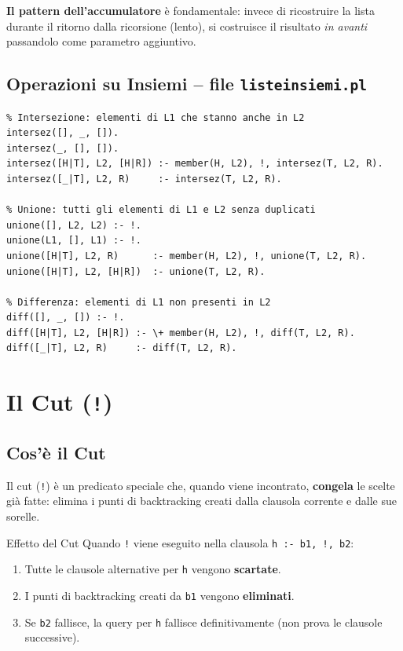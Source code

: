 \documentclass[12pt,a4paper]{article}
\begin{document}
\textbf{Il pattern dell'accumulatore} è fondamentale: invece di ricostruire la
lista durante il ritorno dalla ricorsione (lento), si costruisce il risultato
\emph{in avanti} passandolo come parametro aggiuntivo.

\subsection{Operazioni su Insiemi -- file \texttt{listeinsiemi.pl}}

\begin{lstlisting}
% Intersezione: elementi di L1 che stanno anche in L2
intersez([], _, []).
intersez(_, [], []).
intersez([H|T], L2, [H|R]) :- member(H, L2), !, intersez(T, L2, R).
intersez([_|T], L2, R)     :- intersez(T, L2, R).

% Unione: tutti gli elementi di L1 e L2 senza duplicati
unione([], L2, L2) :- !.
unione(L1, [], L1) :- !.
unione([H|T], L2, R)      :- member(H, L2), !, unione(T, L2, R).
unione([H|T], L2, [H|R])  :- unione(T, L2, R).

% Differenza: elementi di L1 non presenti in L2
diff([], _, []) :- !.
diff([H|T], L2, [H|R]) :- \+ member(H, L2), !, diff(T, L2, R).
diff([_|T], L2, R)     :- diff(T, L2, R).
\end{lstlisting}

\section{Il Cut (\texttt{!})}

\subsection{Cos'è il Cut}

Il cut (\texttt{!}) è un predicato speciale che, quando viene incontrato,
\textbf{congela} le scelte già fatte: elimina i punti di backtracking creati
dalla clausola corrente e dalle sue sorelle.

\begin{defbox}{Effetto del Cut}
Quando \texttt{!} viene eseguito nella clausola \texttt{h :- b1, !, b2}:
\begin{enumerate}[noitemsep]
  \item Tutte le clausole alternative per \texttt{h} vengono \textbf{scartate}.
  \item I punti di backtracking creati da \texttt{b1} vengono \textbf{eliminati}.
  \item Se \texttt{b2} fallisce, la query per \texttt{h} fallisce definitivamente
        (non prova le clausole successive).
\end{enumerate}
\end{defbox}
\end{document}
